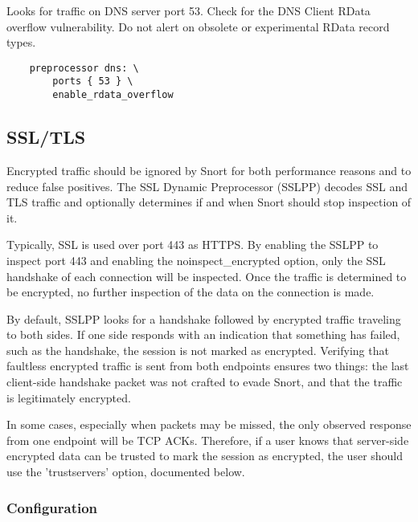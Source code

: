 \documentclass[english]{report}
\begin{document}
Looks for traffic on DNS server port 53.  Check for the DNS Client RData
overflow vulnerability.  Do not alert on obsolete or experimental RData record
types.

\begin{verbatim}
    preprocessor dns: \
        ports { 53 } \
        enable_rdata_overflow
\end{verbatim}

\subsection{SSL/TLS}
\label{sub:SSL/TLS}

Encrypted traffic should be ignored by Snort for both performance reasons and
to reduce false positives.  The SSL Dynamic Preprocessor (SSLPP) decodes SSL
and TLS traffic and optionally determines if and when Snort should stop
inspection of it.

Typically, SSL is used over port 443 as HTTPS.  By enabling the SSLPP to
inspect port 443 and enabling the noinspect\_encrypted option, only the SSL
handshake of each connection will be inspected.  Once the traffic is determined
to be encrypted, no further inspection of the data on the connection is made.

By default, SSLPP looks for a handshake followed by encrypted traffic traveling
to both sides.  If one side responds with an indication that something has
failed, such as the handshake, the session is not marked as encrypted.
Verifying that faultless encrypted traffic is sent from both endpoints ensures
two things: the last client-side handshake packet was not crafted to evade
Snort, and that the traffic is legitimately encrypted.

In some cases, especially when packets may be missed, the only observed
response from one endpoint will be TCP ACKs.  Therefore, if a user knows that
server-side encrypted data can be trusted to mark the session as encrypted, the
user should use the 'trustservers' option, documented below.

\subsubsection{Configuration}
\end{document}

